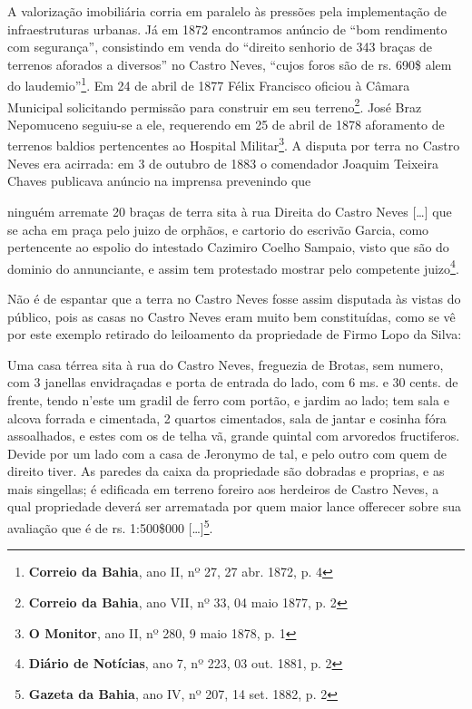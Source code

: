 A valorização imobiliária corria em paralelo às pressões pela implementação de infraestruturas urbanas. Já em 1872 encontramos anúncio de ``bom rendimento com segurança'', consistindo em venda do ``direito senhorio de 343 braças de terrenos aforados a diversos'' no Castro Neves, ``cujos foros são de rs. 690\$ alem do laudemio''\footnote{\textbf{Correio da Bahia}, ano II, nº 27, 27 abr. 1872, p. 4}. Em 24 de abril de 1877 Félix Francisco oficiou à Câmara Municipal solicitando permissão para construir em seu terreno\footnote{\textbf{Correio da Bahia}, ano VII, nº 33, 04 maio 1877, p. 2}. José Braz Nepomuceno seguiu-se a ele, requerendo em 25 de abril de 1878 aforamento de terrenos baldios pertencentes ao Hospital Militar\footnote{\textbf{O Monitor}, ano II, nº 280, 9 maio 1878, p. 1}. A disputa por terra no Castro Neves era acirrada: em 3 de outubro de 1883 o comendador Joaquim Teixeira Chaves publicava anúncio na imprensa prevenindo que 

\begin{citacao}
ninguém arremate 20 braças de terra sita à rua Direita do Castro Neves [\dots] que se acha em praça pelo juizo de orphãos, e cartorio do escrivão Garcia, como pertencente ao espolio do intestado Cazimiro Coelho Sampaio, visto que são do dominio do annunciante, e assim tem protestado mostrar pelo competente juizo\footnote{\textbf{Diário de Notícias}, ano 7, nº 223, 03 out. 1881, p. 2}.
\end{citacao}

Não é de espantar que a terra no Castro Neves fosse assim disputada às vistas do público, pois as casas no Castro Neves eram muito bem constituídas, como se vê por este exemplo retirado do leiloamento da propriedade de Firmo Lopo da Silva:

\begin{citacao}
Uma casa térrea sita à rua do Castro Neves, freguezia de Brotas, sem numero, com 3 janellas envidraçadas e porta de entrada do lado, com 6 ms. e 30 cents. de frente, tendo n'este um gradil de ferro com portão, e jardim ao lado; tem sala e alcova forrada e cimentada, 2 quartos cimentados, sala de jantar e cosinha fóra assoalhados, e estes com os de telha vã, grande quintal com arvoredos fructiferos. Devide por um lado com a casa de Jeronymo de tal, e pelo outro com quem de direito tiver. As paredes da caixa da propriedade são dobradas e proprias, e as mais singellas; é edificada em terreno foreiro aos herdeiros de Castro Neves, a qual propriedade deverá ser arrematada por quem maior lance offerecer sobre sua avaliação que é de rs. 1:500\$000 [\dots]\footnote{\textbf{Gazeta da Bahia}, ano IV, nº 207, 14 set. 1882, p. 2}.
\end{citacao}

